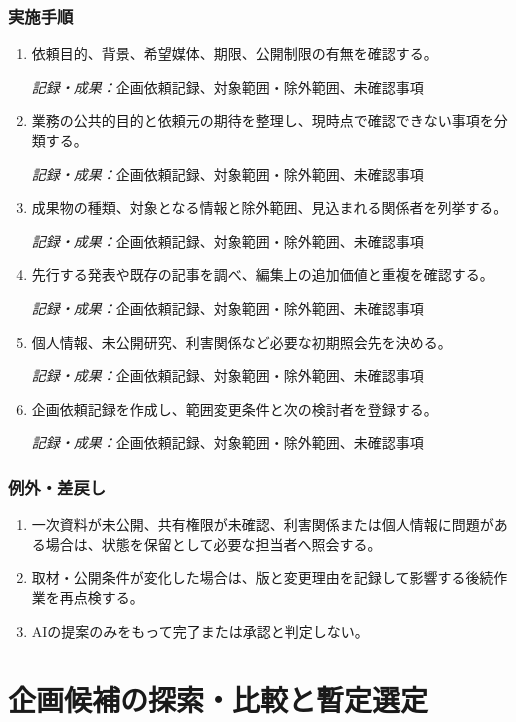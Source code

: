 \documentclass[a4paper,11pt]{article}
\begin{document}
\subsubsection*{実施手順}
\begin{enumerate}[leftmargin=2em,itemsep=0.65em]
\item 依頼目的、背景、希望媒体、期限、公開制限の有無を確認する。\par\noindent\textit{記録・成果：}企画依頼記録、対象範囲・除外範囲、未確認事項\nobreak\smallskip
\item 業務の公共的目的と依頼元の期待を整理し、現時点で確認できない事項を分類する。\par\noindent\textit{記録・成果：}企画依頼記録、対象範囲・除外範囲、未確認事項\nobreak\smallskip
\item 成果物の種類、対象となる情報と除外範囲、見込まれる関係者を列挙する。\par\noindent\textit{記録・成果：}企画依頼記録、対象範囲・除外範囲、未確認事項\nobreak\smallskip
\item 先行する発表や既存の記事を調べ、編集上の追加価値と重複を確認する。\par\noindent\textit{記録・成果：}企画依頼記録、対象範囲・除外範囲、未確認事項\nobreak\smallskip
\item 個人情報、未公開研究、利害関係など必要な初期照会先を決める。\par\noindent\textit{記録・成果：}企画依頼記録、対象範囲・除外範囲、未確認事項\nobreak\smallskip
\item 企画依頼記録を作成し、範囲変更条件と次の検討者を登録する。\par\noindent\textit{記録・成果：}企画依頼記録、対象範囲・除外範囲、未確認事項\nobreak\smallskip
\end{enumerate}
\subsubsection*{例外・差戻し}
\begin{enumerate}[leftmargin=2em,itemsep=0.35em]
\item 一次資料が未公開、共有権限が未確認、利害関係または個人情報に問題がある場合は、状態を保留として必要な担当者へ照会する。
\item 取材・公開条件が変化した場合は、版と変更理由を記録して影響する後続作業を再点検する。
\item AIの提案のみをもって完了または承認と判定しない。
\end{enumerate}
\section{企画候補の探索・比較と暫定選定}
\end{document}
